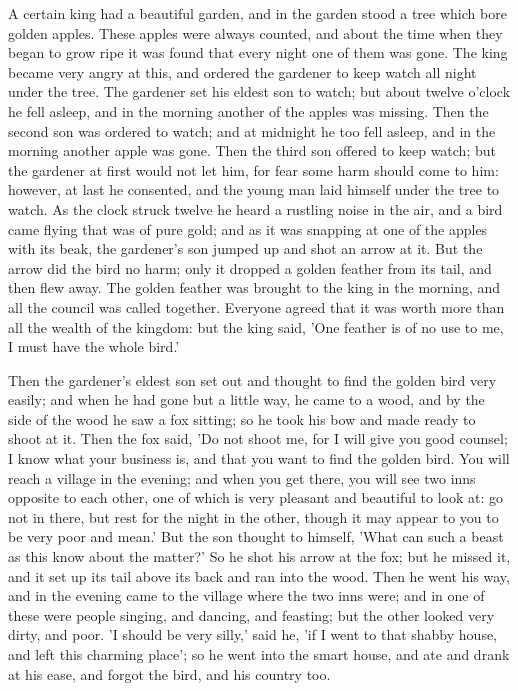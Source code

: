 \documentclass[12pt]{book}
\begin{document}
A certain king had a beautiful garden, and in the garden stood a tree
which bore golden apples. These apples were always counted, and about
the time when they began to grow ripe it was found that every night
one of them was gone. The king became very angry at this, and ordered
the gardener to keep watch all night under the tree. The gardener set
his eldest son to watch; but about twelve o'clock he fell asleep, and
in the morning another of the apples was missing. Then the second son
was ordered to watch; and at midnight he too fell asleep, and in the
morning another apple was gone. Then the third son offered to keep
watch; but the gardener at first would not let him, for fear some harm
should come to him: however, at last he consented, and the young man
laid himself under the tree to watch. As the clock struck twelve he
heard a rustling noise in the air, and a bird came flying that was of
pure gold; and as it was snapping at one of the apples with its beak,
the gardener's son jumped up and shot an arrow at it. But the arrow
did the bird no harm; only it dropped a golden feather from its tail,
and then flew away. The golden feather was brought to the king in the
morning, and all the council was called together. Everyone agreed that
it was worth more than all the wealth of the kingdom: but the king
said, 'One feather is of no use to me, I must have the whole bird.'

Then the gardener's eldest son set out and thought to find the golden
bird very easily; and when he had gone but a little way, he came to a
wood, and by the side of the wood he saw a fox sitting; so he took his
bow and made ready to shoot at it. Then the fox said, 'Do not shoot
me, for I will give you good counsel; I know what your business is,
and that you want to find the golden bird. You will reach a village in
the evening; and when you get there, you will see two inns opposite to
each other, one of which is very pleasant and beautiful to look at: go
not in there, but rest for the night in the other, though it may
appear to you to be very poor and mean.' But the son thought to
himself, 'What can such a beast as this know about the matter?' So he
shot his arrow at the fox; but he missed it, and it set up its tail
above its back and ran into the wood. Then he went his way, and in the
evening came to the village where the two inns were; and in one of
these were people singing, and dancing, and feasting; but the other
looked very dirty, and poor. 'I should be very silly,' said he, 'if I
went to that shabby house, and left this charming place'; so he went
into the smart house, and ate and drank at his ease, and forgot the
bird, and his country too.
\end{document}
